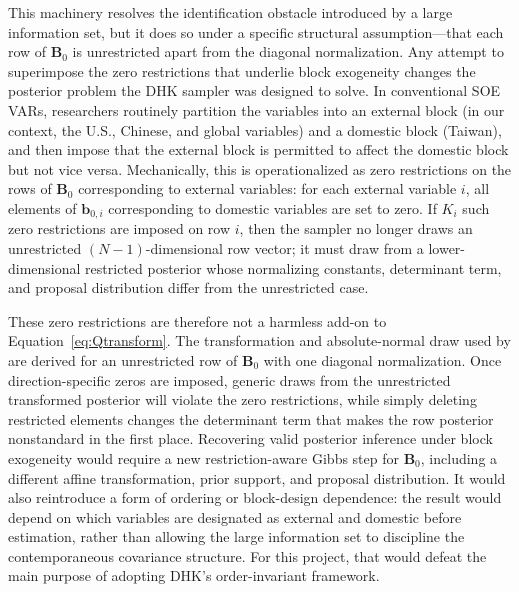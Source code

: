 This machinery resolves the identification obstacle introduced by a large information set, but it does so under a specific structural assumption---that each row of $\mathbf{B}_0$ is unrestricted apart from the diagonal normalization. Any attempt to superimpose the zero restrictions that underlie block exogeneity changes the posterior problem the DHK sampler was designed to solve. In conventional SOE VARs, researchers routinely partition the variables into an external block (in our context, the U.S., Chinese, and global variables) and a domestic block (Taiwan), and then impose that the external block is permitted to affect the domestic block but not vice versa. Mechanically, this is operationalized as zero restrictions on the rows of $\mathbf{B}_0$ corresponding to external variables: for each external variable $i$, all elements of $\mathbf{b}_{0,i}$ corresponding to domestic variables are set to zero. If $K_i$ such zero restrictions are imposed on row $i$, then the sampler no longer draws an unrestricted $(N-1)$-dimensional row vector; it must draw from a lower-dimensional restricted posterior whose normalizing constants, determinant term, and proposal distribution differ from the unrestricted case.

These zero restrictions are therefore not a harmless add-on to Equation~\eqref{eq:Qtransform}. The transformation and absolute-normal draw used by \citet{davidson2025investigating} are derived for an unrestricted row of $\mathbf{B}_0$ with one diagonal normalization. Once direction-specific zeros are imposed, generic draws from the unrestricted transformed posterior will violate the zero restrictions, while simply deleting restricted elements changes the determinant term that makes the row posterior nonstandard in the first place. Recovering valid posterior inference under block exogeneity would require a new restriction-aware Gibbs step for $\mathbf{B}_0$, including a different affine transformation, prior support, and proposal distribution. It would also reintroduce a form of ordering or block-design dependence: the result would depend on which variables are designated as external and domestic before estimation, rather than allowing the large information set to discipline the contemporaneous covariance structure. For this project, that would defeat the main purpose of adopting DHK's order-invariant framework.

